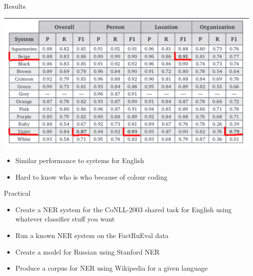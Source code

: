 \documentclass[10pt, compress]{beamer}
\begin{document}
\begin{frame}{Results}

\begin{center}
\includegraphics[width=\textwidth]{graphics/factrueval-results.png}
\end{center}

\begin{itemize}
  \item Similar performance to systems for English
  \item Hard to know who is who because of colour coding
\end{itemize}


\end{frame}

\begin{frame}[standout]
Practical
\end{frame}

\begin{frame}

\begin{itemize}
 \item Create a NER system for the CoNLL-2003 shared task for English using
   whatever classifier stuff you want
 \item Run a known NER system on the FactRuEval data
 \item Create a model for Russian using Stanford NER
 \item Produce a corpus for NER using Wikipedia for a given language
\end{itemize}

\end{frame}
\end{document}
